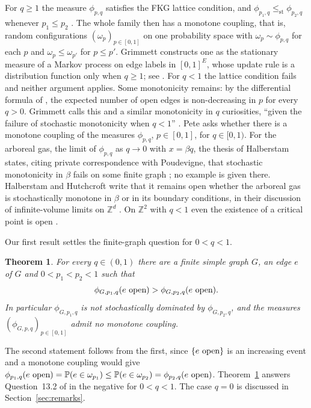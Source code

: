 \documentclass[11pt]{amsart}
\newtheorem{theorem}{Theorem}[section]
\theoremstyle{remark}
\numberwithin{equation}{section}
\newcommand{\Pp}{\mathbb P}
\newcommand{\Z}{\mathbb Z}
\newcommand{\st}{\le_{\mathrm{st}}}
\newcommand{\open}{\ \textup{open}}
\begin{document}
For $q\ge1$ the measure $\phi_{p,q}$ satisfies the FKG lattice condition, and $\phi_{p_1,q}\st\phi_{p_2,q}$ whenever $p_1\le p_2$ \cite[Theorem~3.21]{Gri06}. The whole family then has a monotone coupling, that is, random configurations $(\omega_p)_{p\in[0,1]}$ on one probability space with $\omega_p\sim\phi_{p,q}$ for each $p$ and $\omega_p\le\omega_{p'}$ for $p\le p'$. Grimmett \cite{Gri95} constructs one as the stationary measure of a Markov process on edge labels in $[0,1]^E$, whose update rule is a distribution function only when $q\ge1$; see \cite[Section~13.1]{Pet24}. For $q<1$ the lattice condition fails and neither argument applies. Some monotonicity remains: by the differential formula of \cite[Theorem~3.12]{Gri06}, the expected number of open edges is non-decreasing in $p$ for every $q>0$. Grimmett calls this and a similar monotonicity in $q$ curiosities, ``given the failure of stochastic monotonicity when $q<1$'' \cite[p.~41]{Gri06}. Pete \cite[Question~13.2]{Pet24} asks whether there is a monotone coupling of the measures $\phi_{p,q}$, $p\in[0,1]$, for $q\in[0,1)$. For the arboreal gas, the limit of $\phi_{p,q}$ as $q\to0$ with $x=\beta q$, the thesis of Halberstam states, citing private correspondence with Poudevigne, that stochastic monotonicity in $\beta$ fails on some finite graph \cite[p.~18]{Hal23}; no example is given there. Halberstam and Hutchcroft write that it remains open whether the arboreal gas is stochastically monotone in $\beta$ or in its boundary conditions, in their discussion of infinite-volume limits on $\Z^d$ \cite{HH24}. On $\Z^2$ with $q<1$ even the existence of a critical point is open \cite{BFO25}.

Our first result settles the finite-graph question for $0<q<1$.

\begin{theorem}\label{thm:main}
For every $q\in(0,1)$ there are a finite simple graph $G$, an edge $e$ of $G$ and $0<p_1<p_2<1$ such that
\[
 \phi_{G,p_1,q}(e\open)>\phi_{G,p_2,q}(e\open).
\]
In particular $\phi_{G,p_1,q}$ is not stochastically dominated by $\phi_{G,p_2,q}$, and the measures $(\phi_{G,p,q})_{p\in[0,1]}$ admit no monotone coupling.
\end{theorem}

The second statement follows from the first, since $\{e\open\}$ is an increasing event and a monotone coupling would give $\phi_{p_1,q}(e\open)=\Pp(e\in\omega_{p_1})\le\Pp(e\in\omega_{p_2})=\phi_{p_2,q}(e\open)$. Theorem~\ref{thm:main} answers Question~13.2 of \cite{Pet24} in the negative for $0<q<1$. The case $q=0$ is discussed in Section~\ref{sec:remarks}.
\end{document}
